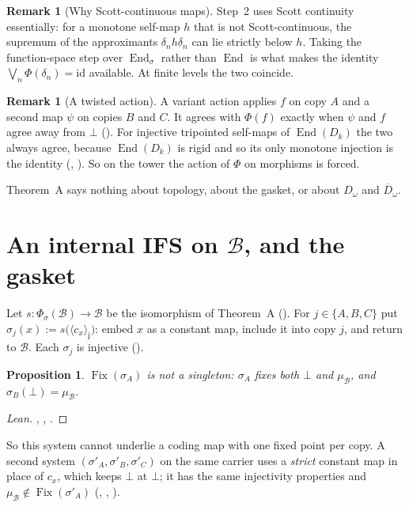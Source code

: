 \documentclass[11pt]{amsart}
\theoremstyle{plain}
\newtheorem{proposition}[theorem]{Proposition}
\theoremstyle{definition}
\newtheorem{remark}[theorem]{Remark}
\newcommand{\End}{\operatorname{End}}
\newcommand{\SEnd}{\operatorname{End}_\sigma}
\newcommand{\Fix}{\operatorname{Fix}}
\newcommand{\cst}[1]{c_{#1}}
\newcommand{\tg}[2]{\langle #1\rangle_{\mathsf{#2}}}
\newcommand{\Dc}{D_\omega}
\newcommand{\Db}{\overline{D}_\omega}
\newcommand{\BB}{\mathcal{B}}
\newcommand{\id}{\mathrm{id}}
\begin{document}
\begin{remark}[Why Scott-continuous maps]
Step~2 uses Scott continuity essentially: for a monotone self-map $h$ that is
not Scott-continuous, the supremum of the approximants $\delta_nh\delta_n$ can
lie strictly below $h$. Taking the function-space step over $\SEnd$ rather than
$\End$ is what makes the identity $\bigvee_n\Phi(\delta_n)=\id$ available. At
finite levels the two coincide.
\end{remark}

\begin{remark}[A twisted action]
A variant action applies $f$ on copy $A$ and a second map $\psi$ on copies $B$
and $C$. It agrees with $\Phi(f)$ exactly when $\psi$ and $f$ agree away from
$\bot$ (). For injective
tripointed self-maps of $\End(D_k)$ the two always agree, because $\End(D_k)$
is rigid and so its only monotone injection is the identity
(,
). So on the tower the action of $\Phi$ on
morphisms is forced.
\end{remark}

Theorem~A says nothing about topology, about the gasket, or about $\Dc$ and
$\Db$.

\section{An internal IFS on \texorpdfstring{$\BB$}{B}, and the gasket}\label{sec:ifs}

Let $s\colon\Phi_\sigma(\BB)\to\BB$ be the isomorphism of Theorem~A
(). For $j\in\{A,B,C\}$ put
$\sigma_j(x):=s\bigl(\tg{\cst x}j\bigr)$: embed $x$ as a constant map, include it
into copy $j$, and return to $\BB$. Each $\sigma_j$ is injective
().

\begin{proposition}\label{prop:escape}
$\Fix(\sigma_A)$ is not a singleton: $\sigma_A$ fixes both $\bot$ and
$\mu_\BB$, and $\sigma_B(\bot)=\mu_\BB$.
\end{proposition}
\begin{proof}[Lean]
, ,
.
\end{proof}

So this system cannot underlie a coding map with one fixed point per copy. A
second system $(\sigma'_A,\sigma'_B,\sigma'_C)$ on the same carrier uses a
\emph{strict} constant map in place of $\cst x$, which keeps $\bot$ at $\bot$; it
has the same injectivity properties and $\mu_\BB\notin\Fix(\sigma'_A)$
(, ,
).
\end{document}
